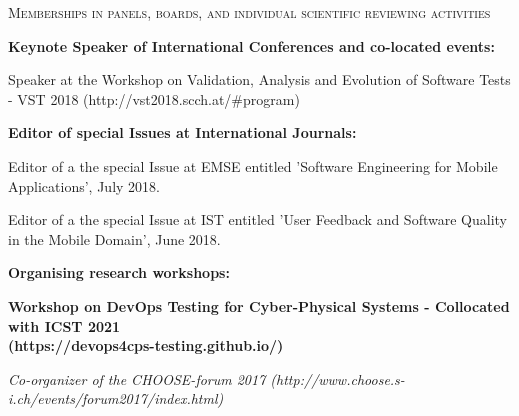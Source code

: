 \documentclass[12pt]{article}
\newcommand{\blankline}{\quad\pagebreak[3]}
\begin{document}



\vspace{6.5mm}

\textsc{Memberships in panels, boards, and individual scientific reviewing activities}

\vspace{3.5mm}


\textbf{Keynote Speaker of International Conferences and co-located events:}
\begin{innerlist}
\item Speaker at the Workshop on Validation, Analysis and Evolution of Software Tests - VST 2018  (http://vst2018.scch.at/\#program) 
	
\end{innerlist}

\textbf{Editor of special Issues at International Journals:}
\begin{innerlist}
\item Editor of a the special Issue at EMSE entitled 'Software Engineering for Mobile Applications', July 2018.
\item Editor of a the special Issue at IST entitled 'User Feedback and Software Quality in the Mobile Domain',  June 2018.
	
\end{innerlist}

\textbf{Organising research workshops:}
\begin{innerlist}
\item \textbf{Workshop on DevOps Testing for Cyber-Physical Systems - Collocated with ICST 2021 \\(https://devops4cps-testing.github.io/)} 
\item \textit{Co-organizer of the CHOOSE-forum 2017  (http://www.choose.s-i.ch/events/forum2017/index.html)} 
\end{innerlist}
\end{document}
